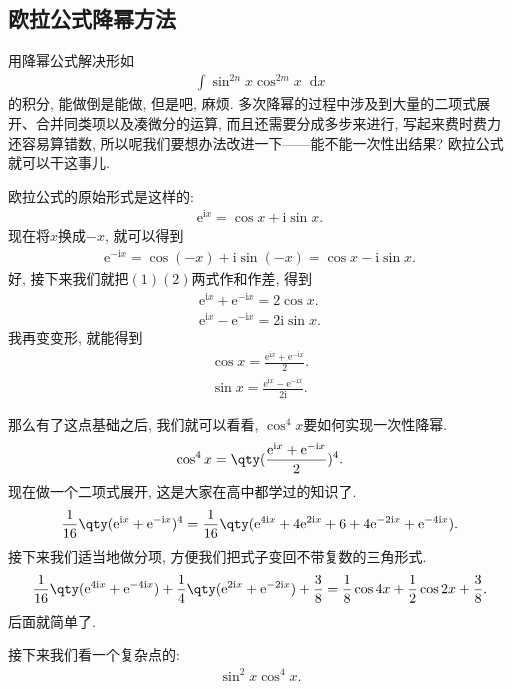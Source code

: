 \documentclass{ctexbook}
\newcommand{\e}{\mathrm{e}}
\newcommand{\im}{\mathrm{i}}
\newcommand*{\dif}{\mathop{}\!\mathrm{d}}
\begin{document}
{\subsection{欧拉公式降幂方法}
用降幂公式解决形如
\begin{align*}
\int\sin^{2n}{x}\cos^{2m}{x}\dif{x}
\end{align*}
的积分, 能做倒是能做, 但是吧, 麻烦. 多次降幂的过程中涉及到大量的二项式展开、合并同类项以及凑微分的运算, 而且还需要分成多步来进行, 写起来费时费力还容易算错数, 所以呢我们要想办法改进一下——能不能一次性出结果? 欧拉公式就可以干这事儿. \par
欧拉公式的原始形式是这样的: 
\begin{align*}
\e^{\im x}=\cos{x}+\im\sin{x}.\tag{1}
\end{align*}
现在将$x$换成$-x$, 就可以得到
\begin{align*}
\e^{-\im x}=\cos(-x)+\im\sin(-x)=\cos{x}-\im\sin{x}.\tag{2}
\end{align*}
好, 接下来我们就把$(1)(2)$两式作和作差, 得到
\begin{align*}
\e^{\im x}+\e^{-\im x}=2\cos{x}.\\
\e^{\im x}-\e^{-\im x}=2\im\sin{x}
.\end{align*}
我再变变形, 就能得到
\begin{align*}
\cos{x}=\frac{\e^{\im x}+\e^{-\im x}}{2}.\tag{3}\\
\sin{x}=\frac{\e^{\im x}-\e^{-\im x}}{2\im}.\tag{4}
\end{align*}\par
那么有了这点基础之后, 我们就可以看看, $\cos^{4}{x}$要如何实现一次性降幂. 
\begin{align*}
\cos^{4}{x}=\qty(\frac{\e^{\im x}+\e^{-\im x}}{2})^{4}
.\end{align*}
现在做一个二项式展开, 这是大家在高中都学过的知识了. 
\begin{align*}
\frac{1}{16}\qty(\e^{\im x}+\e^{-\im x})^{4}=\frac{1}{16}\qty(\e^{4\im x}+4\e^{2\im x}+6+4\e^{-2\im x}+\e^{-4\im x})
.\end{align*}
接下来我们适当地做分项, 方便我们把式子变回不带复数的三角形式. 
\begin{align*}
\frac{1}{16}\qty(\e^{4\im x}+\e^{-4\im x})+\frac{1}{4}\qty(\e^{2\im x}+\e^{-2\im x})+\frac{3}{8}=\frac{1}{8}\cos{4x}+\frac{1}{2}\cos{2x}+\frac{3}{8}
.\end{align*}
后面就简单了. \par
接下来我们看一个复杂点的: 
\begin{align*}
\sin^{2}{x}\cos^{4}{x}
.\end{align*}
}
\end{document}
